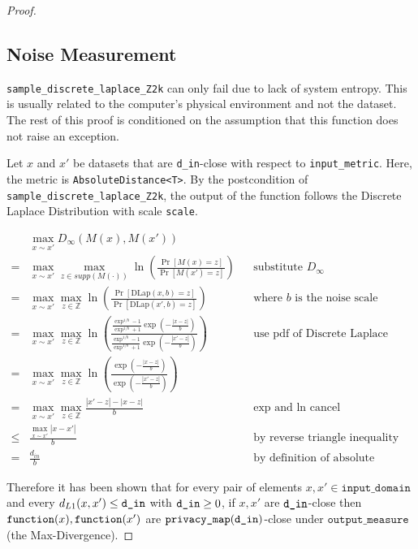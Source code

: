 \documentclass{article}
\begin{document}
\begin{proof}
\subsection{Noise Measurement}
\texttt{sample\_discrete\_laplace\_Z2k} can only fail due to lack of system entropy. 
This is usually related to the computer's physical environment and not the dataset. 
The rest of this proof is conditioned on the assumption that this function does not raise an exception. 

Let $x$ and $x'$ be datasets that are \texttt{d\_in}-close with respect to \texttt{input\_metric}.
Here, the metric is \texttt{AbsoluteDistance<T>}.
By the postcondition of \texttt{sample\_discrete\_laplace\_Z2k},
the output of the function follows the Discrete Laplace Distribution with scale \texttt{scale}.

\begin{align*}
    & \max_{x \sim x'} D_{\infty}(M(x), M(x'))  \\
    =& \max_{x \sim x'} \max_{z \in supp(M(\cdot))} \ln\left(\frac{\Pr\left[M(x) = z\right]}{\Pr\left[M(x') = z \right]}\right)
        &&\text{substitute } D_{\infty}\\
    =& \max_{x \sim x'} \max_{z \in \mathbb{Z}} \ln\left(\frac{\Pr\left[\mathrm{DLap}(x, b) = z \right]}{\Pr\left[\mathrm{DLap}(x', b) = z\right]}\right)
        &&\text{where } b \text{ is the noise scale} \\
    =& \max_{x \sim x'} \max_{z \in \mathbb{Z}} \ln\left(\frac{
    \frac{\exp^{1/b} - 1}{\exp^{1/b} + 1} \exp \left( -\frac{|x - z|}{b} \right)
    }{
        \frac{\exp^{1/b} - 1}{\exp^{1/b} + 1} \exp \left( -\frac{|x' - z|}{b} \right)
    }\right) 
        &&\text{use pdf of Discrete Laplace} \\
    =& \max_{x \sim x'} \max_{z \in \mathbb{Z}} \ln\left(\frac{
    \exp \left( -\frac{|x - z|}{b} \right)
    }{
        \exp \left( -\frac{|x' - z|}{b} \right)
    }\right) \\
    =& \max_{x \sim x'} \max_{z \in \mathbb{Z}}\frac{|x' - z| - |x - z|}{b}&& \text{exp and ln cancel} \\
    \leq& \frac{\max_{x \sim x'} |x - x'|}{b} &&\text{by reverse triangle inequality} \\
    =& \frac{d_{in}}{b}  &&\text{by definition of absolute distance}
\end{align*}

Therefore it has been shown that for every pair of elements $x, x' \in \texttt{input\_domain}$ and every $d_{L1}(x, x') \le \texttt{d\_in}$ with $\texttt{d\_in} \ge 0$, 
if $x, x'$ are $\texttt{d\_in}$-close then $\texttt{function}(x),\texttt{function}(x')$ are $\texttt{privacy\_map}(\texttt{d\_in})$-close under $\texttt{output\_measure}$ (the Max-Divergence).


\end{proof}
\end{document}

